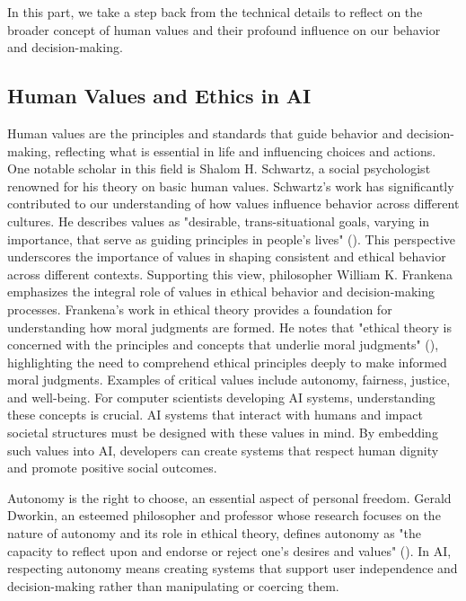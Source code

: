 \documentclass[
  letterpaper,
  numbers=noenddot,
  DIV=11]{scrreprt}
\theoremstyle{definition}
\theoremstyle{plain}
\theoremstyle{plain}
\theoremstyle{remark}
\begin{document}
In this part, we take a step back from the technical details to reflect
on the broader concept of human values and their profound influence on
our behavior and decision-making.

\subsection{Human Values and Ethics in
AI}\label{human-values-and-ethics-in-ai}

Human values are the principles and standards that guide behavior and
decision-making, reflecting what is essential in life and influencing
choices and actions. One notable scholar in this field is Shalom H.
Schwartz, a social psychologist renowned for his theory on basic human
values. Schwartz's work has significantly contributed to our
understanding of how values influence behavior across different
cultures. He describes values as "desirable, trans-situational goals,
varying in importance, that serve as guiding principles in people's
lives" (). This
perspective underscores the importance of values in shaping consistent
and ethical behavior across different contexts. Supporting this view,
philosopher William K. Frankena emphasizes the integral role of values
in ethical behavior and decision-making processes. Frankena's work in
ethical theory provides a foundation for understanding how moral
judgments are formed. He notes that "ethical theory is concerned with
the principles and concepts that underlie moral judgments"
(), highlighting the
need to comprehend ethical principles deeply to make informed moral
judgments. Examples of critical values include autonomy, fairness,
justice, and well-being. For computer scientists developing AI systems,
understanding these concepts is crucial. AI systems that interact with
humans and impact societal structures must be designed with these values
in mind. By embedding such values into AI, developers can create systems
that respect human dignity and promote positive social outcomes.

Autonomy is the right to choose, an essential aspect of personal
freedom. Gerald Dworkin, an esteemed philosopher and professor whose
research focuses on the nature of autonomy and its role in ethical
theory, defines autonomy as "the capacity to reflect upon and endorse or
reject one's desires and values"
(). In AI, respecting
autonomy means creating systems that support user independence and
decision-making rather than manipulating or coercing them.
\end{document}

